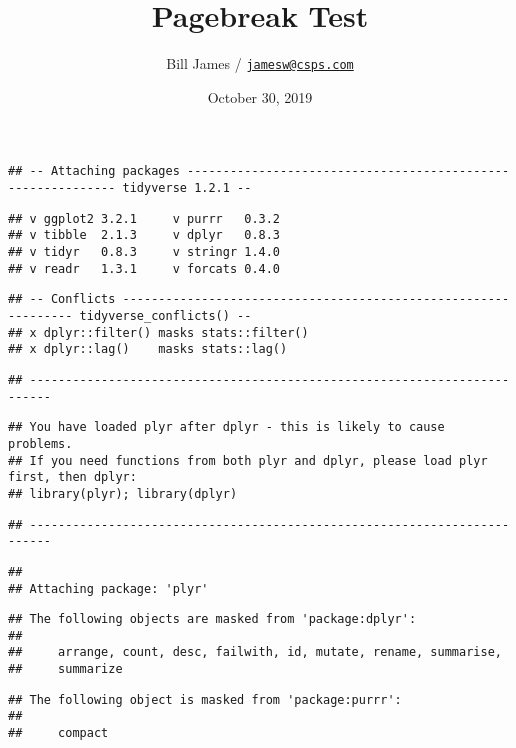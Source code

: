 \documentclass[]{article}
\title{Pagebreak Test}
\author{Bill James / \href{mailto:jamesw@csps.com}{\nolinkurl{jamesw@csps.com}}}
\date{October 30, 2019}
\begin{document}
\maketitle

\begin{verbatim}
## -- Attaching packages ------------------------------------------------------------ tidyverse 1.2.1 --
\end{verbatim}

\begin{verbatim}
## v ggplot2 3.2.1     v purrr   0.3.2
## v tibble  2.1.3     v dplyr   0.8.3
## v tidyr   0.8.3     v stringr 1.4.0
## v readr   1.3.1     v forcats 0.4.0
\end{verbatim}

\begin{verbatim}
## -- Conflicts --------------------------------------------------------------- tidyverse_conflicts() --
## x dplyr::filter() masks stats::filter()
## x dplyr::lag()    masks stats::lag()
\end{verbatim}

\begin{verbatim}
## -------------------------------------------------------------------------
\end{verbatim}

\begin{verbatim}
## You have loaded plyr after dplyr - this is likely to cause problems.
## If you need functions from both plyr and dplyr, please load plyr first, then dplyr:
## library(plyr); library(dplyr)
\end{verbatim}

\begin{verbatim}
## -------------------------------------------------------------------------
\end{verbatim}

\begin{verbatim}
## 
## Attaching package: 'plyr'
\end{verbatim}

\begin{verbatim}
## The following objects are masked from 'package:dplyr':
## 
##     arrange, count, desc, failwith, id, mutate, rename, summarise,
##     summarize
\end{verbatim}

\begin{verbatim}
## The following object is masked from 'package:purrr':
## 
##     compact
\end{verbatim}
\end{document}
